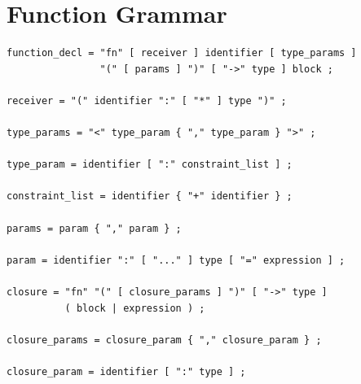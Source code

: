 \section{Function Grammar}

\begin{lstlisting}[language=EBNF]
function_decl = "fn" [ receiver ] identifier [ type_params ]
                "(" [ params ] ")" [ "->" type ] block ;

receiver = "(" identifier ":" [ "*" ] type ")" ;

type_params = "<" type_param { "," type_param } ">" ;

type_param = identifier [ ":" constraint_list ] ;

constraint_list = identifier { "+" identifier } ;

params = param { "," param } ;

param = identifier ":" [ "..." ] type [ "=" expression ] ;

closure = "fn" "(" [ closure_params ] ")" [ "->" type ]
          ( block | expression ) ;

closure_params = closure_param { "," closure_param } ;

closure_param = identifier [ ":" type ] ;
\end{lstlisting}
